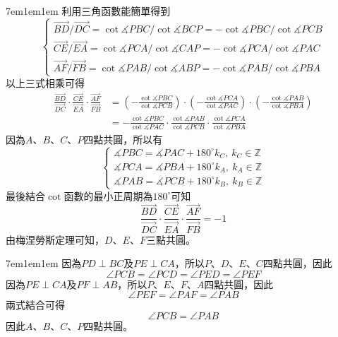 \documentclass[12pt]{article}
\begin{document}
\begin{mybox}[必要性證明]{7em}{1em}{1em}
    利用三角函數能簡單得到
    $$
        \begin{cases}
            \overrightarrow{BD}/\overrightarrow{DC}=\cot{\measuredangle{PBC}}/\cot{\measuredangle{BCP}}=-\cot{\measuredangle{PBC}}/\cot{\measuredangle{PCB}}\\
            \overrightarrow{CE}/\overrightarrow{EA}=\cot{\measuredangle{PCA}}/\cot{\measuredangle{CAP}}=-\cot{\measuredangle{PCA}}/\cot{\measuredangle{PAC}}\\
            \overrightarrow{AF}/\overrightarrow{FB}=\cot{\measuredangle{PAB}}/\cot{\measuredangle{ABP}}=-\cot{\measuredangle{PAB}}/\cot{\measuredangle{PBA}}
        \end{cases}
    $$
    以上三式相乘可得
    \begin{align*}
        \frac{\overrightarrow{BD}}{\overrightarrow{DC}}
        \cdot\frac{\overrightarrow{CE}}{\overrightarrow{EA}}
        \cdot\frac{\overrightarrow{AF}}{\overrightarrow{FB}}&=
        \left(-\frac{\cot{\measuredangle{PBC}}}{\cot{\measuredangle{PCB}}}\right)
        \cdot\left(-\frac{\cot{\measuredangle{PCA}}}{\cot{\measuredangle{PAC}}}\right)
        \cdot\left(-\frac{\cot{\measuredangle{PAB}}}{\cot{\measuredangle{PBA}}}\right)\\
        &=-\frac{\cot{\measuredangle{PBC}}}{\cot{\measuredangle{PAC}}}
        \cdot\frac{\cot{\measuredangle{PAB}}}{\cot{\measuredangle{PCB}}}
        \cdot\frac{\cot{\measuredangle{PCA}}}{\cot{\measuredangle{PBA}}}
    \end{align*}
    因為$A$、$B$、$C$、$P$四點共圓，所以有
    $$
        \begin{cases}
            \measuredangle{PBC}=\measuredangle{PAC}+180^{\circ}k_C,\ k_C\in\mathbb{Z}\\
            \measuredangle{PCA}=\measuredangle{PBA}+180^{\circ}k_A,\ k_A\in\mathbb{Z}\\
            \measuredangle{PAB}=\measuredangle{PCB}+180^{\circ}k_B,\ k_B\in\mathbb{Z}
        \end{cases}
    $$
    最後結合$\cot{}$函數的最小正周期為$180^{\circ}$可知
    $$
        \frac{\overrightarrow{BD}}{\overrightarrow{DC}}
        \cdot\frac{\overrightarrow{CE}}{\overrightarrow{EA}}
        \cdot\frac{\overrightarrow{AF}}{\overrightarrow{FB}} = -1
    $$
    由梅涅勞斯定理可知，$D$、$E$、$F$三點共圓。
\end{mybox}
\begin{mybox}[充分性證明]{7em}{1em}{1em}
    因為$PD\perp BC$及$PE\perp CA$，所以$P$、$D$、$E$、$C$四點共圓，因此
    $$
        \angle{PCB}=\angle{PCD}=\angle{PED}=\angle{PEF}
    $$
    因為$PE\perp CA$及$PF\perp AB$，所以$P$、$E$、$F$、$A$四點共圓，因此
    $$
        \angle{PEF}=\angle{PAF}=\angle{PAB}
    $$
    兩式結合可得
    $$
        \angle{PCB}=\angle{PAB}
    $$
    因此$A$、$B$、$C$、$P$四點共圓。
\end{mybox}
\end{document}
